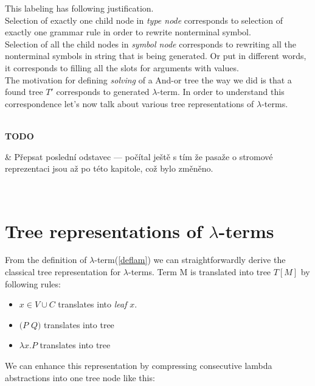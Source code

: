 \documentclass[12pt,a4paper]{report}
\newcommand{\lterm}{$\lambda$-term\xspace}
\newcommand{\lterms}{$\lambda$-terms\xspace}
\newenvironment{todo}
{ ~\\[0.5em]
  {\color{red}\textbf{TODO}}
  \begin{easylist}[itemize]}
{ \end{easylist}
  ~}
\begin{document}
This labeling has following justification.\\

Selection of exactly one
child node in \textit{type node} corresponds to selection of exactly one
grammar rule in order to rewrite nonterminal symbol.  \\

Selection of all the child nodes in \textit{symbol node} corresponds to 
rewriting all the nonterminal symbols in string that is being generated.
Or put in different words, it corresponds to filling all the slots
for arguments with values.\\  

The motivation for defining \textit{solving} of a And-or tree the way we did is that
a found tree $T'$ corresponds to generated \lterm. 
In order to understand this correspondence let's now talk about various tree representations
of \lterms.


\begin{todo}
 & Přepsat poslední odstavec --- počítal ještě s tím že 
   pasaže o stromové reprezentaci jsou až po této kapitole, což bylo změněno.
\end{todo}


\section{Tree representations of \lterms}
\label{tree-reps}

\newcommand{\sexprTree}{sexpr-tree\xspace}
\newcommand{\atTree}{@-tree\xspace}



From the definition of \lterm (\ref{deflam}) we can straightforwardly derive 
the classical tree representation for \lterms. Term M is translated into tree $T[M]$ by following rules:

\begin{itemize}
	\item $x \in V \cup C$ translates into \textit{leaf} $x$.
	\item $(P$ $Q)$ translates into tree\\
	\item $\lambda x . P$ translates into tree\\
\end{itemize}

We can enhance this representation by compressing consecutive lambda abstractions into one
tree node like this: 
\end{document}
